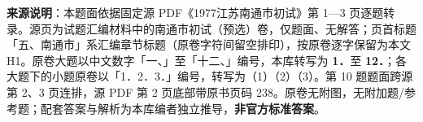 


\begin{gktip}
\textbf{来源说明}：本题面依据固定源 PDF《1977江苏南通市初试》第 1—3 页逐题转录。源页为试题汇编材料中的南通市初试（预选）卷，仅题面、无解答；页首标题「五、南通市」系汇编章节标题（原卷字符间留空排印），按原卷逐字保留为本文 H1。原卷大题以中文数字「一、」至「十二、」编号，本库转写为 \textbf{1．}至 \textbf{12．}；各大题下的小题原卷以「1．2．3．」编号，转写为（1）（2）（3）。第 10 题题面跨源第 2、3 页连排，源 PDF 第 2 页底部带原书页码 238。原卷无附图，无附加题/参考题；配套答案与解析为本库编者独立推导，\textbf{非官方标准答案}。
\end{gktip}

\par\medskip

